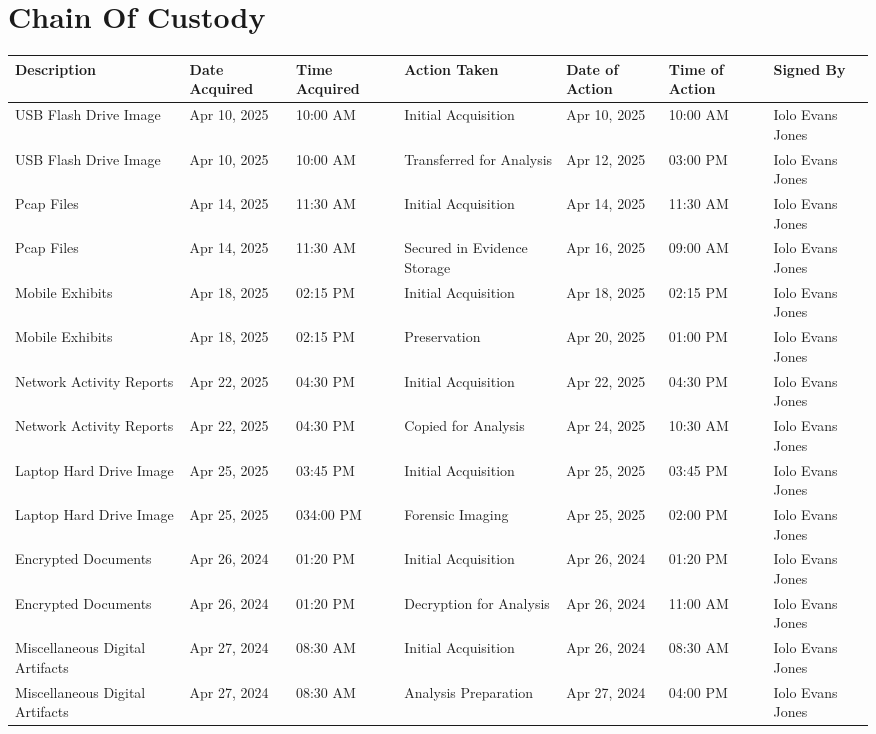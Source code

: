 
\chapter{Chain Of Custody}

\begin{longtable}{|p{2.3cm}|p{1.8cm}|p{1.8cm}|p{2.7cm}|p{1.8cm}|p{1.8cm}|p{1.8cm}|}
  \hline
  \textbf{Description} & \textbf{Date Acquired} & \textbf{Time Acquired} & \textbf{Action Taken} & \textbf{Date of Action} & \textbf{Time of Action} & \textbf{Signed By} \\
  \hline
  \endhead
  
  USB Flash Drive Image & Apr 10, 2025 & 10:00 AM & Initial Acquisition & Apr 10, 2025 & 10:00 AM & Iolo Evans Jones \\
  \hline
  USB Flash Drive Image & Apr 10, 2025 & 10:00 AM & Transferred for Analysis & Apr 12, 2025 & 03:00 PM & Iolo Evans Jones \\
  \hline
  Pcap Files & Apr 14, 2025 & 11:30 AM & Initial Acquisition & Apr 14, 2025 & 11:30 AM & Iolo Evans Jones \\
  \hline
  Pcap Files & Apr 14, 2025 & 11:30 AM & Secured in Evidence Storage & Apr 16, 2025 & 09:00 AM & Iolo Evans Jones \\
  \hline
  Mobile Exhibits & Apr 18, 2025 & 02:15 PM & Initial Acquisition & Apr 18, 2025 & 02:15 PM & Iolo Evans Jones \\
  \hline
  Mobile Exhibits & Apr 18, 2025 & 02:15 PM & Preservation & Apr 20, 2025 & 01:00 PM & Iolo Evans Jones \\
  \hline
  Network Activity Reports & Apr 22, 2025 & 04:30 PM & Initial Acquisition & Apr 22, 2025 & 04:30 PM & Iolo Evans Jones \\
  \hline
  Network Activity Reports & Apr 22, 2025 & 04:30 PM & Copied for Analysis & Apr 24, 2025 & 10:30 AM & Iolo Evans Jones \\
  \hline
  Laptop Hard Drive Image & Apr 25, 2025 & 03:45 PM & Initial Acquisition & Apr 25, 2025 & 03:45 PM & Iolo Evans Jones \\
  \hline
  Laptop Hard Drive Image & Apr 25, 2025 & 034:00 PM & Forensic Imaging & Apr 25, 2025 & 02:00 PM & Iolo Evans Jones \\
  \hline
  Encrypted Documents & Apr 26, 2024 & 01:20 PM & Initial Acquisition & Apr 26, 2024 & 01:20 PM & Iolo Evans Jones \\
  \hline
  Encrypted Documents & Apr 26, 2024 & 01:20 PM & Decryption for Analysis & Apr 26, 2024 & 11:00 AM & Iolo Evans Jones \\
  \hline
  Miscellaneous Digital Artifacts & Apr 27, 2024 & 08:30 AM & Initial Acquisition & Apr 26, 2024 & 08:30 AM & Iolo Evans Jones \\
  \hline
  Miscellaneous Digital Artifacts & Apr 27, 2024 & 08:30 AM & Analysis Preparation & Apr 27, 2024 & 04:00 PM & Iolo Evans Jones \\
  \hline
  \end{longtable}